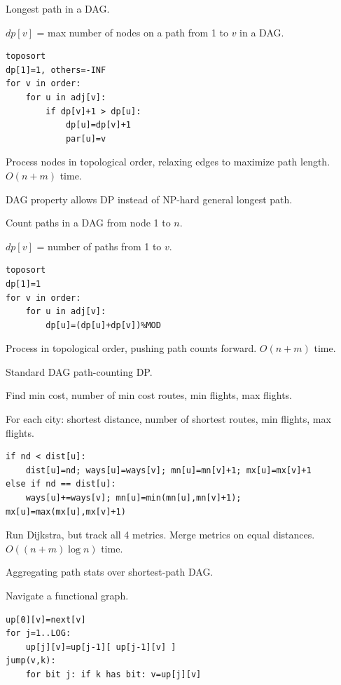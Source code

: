 
\Problem Longest path in a DAG.

\State $dp[v]$ = max number of nodes on a path from 1 to $v$ in a DAG.
\begin{lstlisting}
toposort
dp[1]=1, others=-INF
for v in order:
    for u in adj[v]:
        if dp[v]+1 > dp[u]:
            dp[u]=dp[v]+1
            par[u]=v
\end{lstlisting}

\Solution Process nodes in topological order, relaxing edges to maximize path length. $O(n+m)$ time.

\Analysis DAG property allows DP instead of NP-hard general longest path.


\Problem Count paths in a DAG from node 1 to $n$.

\State $dp[v]$ = number of paths from 1 to $v$.
\begin{lstlisting}
toposort
dp[1]=1
for v in order:
    for u in adj[v]:
        dp[u]=(dp[u]+dp[v])%MOD
\end{lstlisting}

\Solution Process in topological order, pushing path counts forward. $O(n+m)$ time.

\Analysis Standard DAG path-counting DP.


\Problem Find min cost, number of min cost routes, min flights, max flights.

\State For each city: shortest distance, number of shortest routes, min flights, max flights.
\begin{lstlisting}
if nd < dist[u]:
    dist[u]=nd; ways[u]=ways[v]; mn[u]=mn[v]+1; mx[u]=mx[v]+1
else if nd == dist[u]:
    ways[u]+=ways[v]; mn[u]=min(mn[u],mn[v]+1); mx[u]=max(mx[u],mx[v]+1)
\end{lstlisting}

\Solution Run Dijkstra, but track all 4 metrics. Merge metrics on equal distances. $O((n+m)\log n)$ time.

\Analysis Aggregating path stats over shortest-path DAG.


\Problem Navigate a functional graph. 

\begin{lstlisting}
up[0][v]=next[v]
for j=1..LOG:
    up[j][v]=up[j-1][ up[j-1][v] ]
jump(v,k):
    for bit j: if k has bit: v=up[j][v]
\end{lstlisting}


